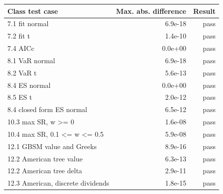 \begin{tabular}{lrr}
\toprule
Class test case & Max. abs. difference & Result \\
\midrule
7.1 fit normal & 6.9e-18 & pass \\
7.2 fit t & 1.4e-10 & pass \\
7.4 AICc & 0.0e+00 & pass \\
8.1 VaR normal & 6.9e-18 & pass \\
8.2 VaR t & 5.6e-13 & pass \\
8.4 ES normal & 0.0e+00 & pass \\
8.5 ES t & 2.0e-12 & pass \\
8.4 closed form ES normal & 6.5e-12 & pass \\
10.3 max SR, w >= 0 & 1.6e-08 & pass \\
10.4 max SR, 0.1 <= w <= 0.5 & 5.9e-08 & pass \\
12.1 GBSM value and Greeks & 8.9e-16 & pass \\
12.2 American tree value & 6.3e-13 & pass \\
12.2 American tree delta & 2.9e-11 & pass \\
12.3 American, discrete dividends & 1.8e-15 & pass \\
\bottomrule
\end{tabular}
